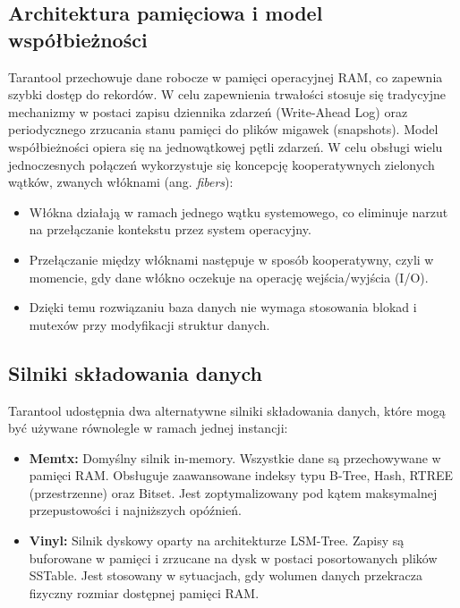 \subsection{Architektura pamięciowa i model współbieżności}
Tarantool przechowuje dane robocze w pamięci operacyjnej RAM, co zapewnia szybki dostęp do rekordów. W celu zapewnienia trwałości stosuje się tradycyjne mechanizmy w postaci zapisu dziennika zdarzeń (Write-Ahead Log) oraz periodycznego zrzucania stanu pamięci do plików migawek (snapshots).
Model współbieżności opiera się na jednowątkowej pętli zdarzeń. W celu obsługi wielu jednoczesnych połączeń wykorzystuje się koncepcję kooperatywnych zielonych wątków, zwanych włóknami (ang. \emph{fibers}):
\begin{itemize}
    \item Włókna działają w ramach jednego wątku systemowego, co eliminuje narzut na przełączanie kontekstu przez system operacyjny.
    \item Przełączanie między włóknami następuje w sposób kooperatywny, czyli w momencie, gdy dane włókno oczekuje na operację wejścia/wyjścia (I/O).
    \item Dzięki temu rozwiązaniu baza danych nie wymaga stosowania blokad i mutexów przy modyfikacji struktur danych.
\end{itemize}

\subsection{Silniki składowania danych}
Tarantool udostępnia dwa alternatywne silniki składowania danych, które mogą być używane równolegle w ramach jednej instancji:
\begin{itemize}
    \item \textbf{Memtx:} Domyślny silnik in-memory. Wszystkie dane są przechowywane w pamięci RAM. Obsługuje zaawansowane indeksy typu B-Tree, Hash, RTREE (przestrzenne) oraz Bitset. Jest zoptymalizowany pod kątem maksymalnej przepustowości i najniższych opóźnień.
    \item \textbf{Vinyl:} Silnik dyskowy oparty na architekturze LSM-Tree. Zapisy są buforowane w pamięci i zrzucane na dysk w postaci posortowanych plików SSTable. Jest stosowany w sytuacjach, gdy wolumen danych przekracza fizyczny rozmiar dostępnej pamięci RAM.
\end{itemize}

